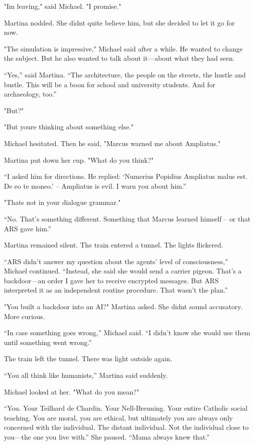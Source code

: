 \documentclass[
]{article}
\begin{document}
"I\textquotesingle m leaving," said Michael. "I promise."

Martina nodded. She didn\textquotesingle t quite believe him, but she decided to let it go for now.

"The simulation is impressive," Michael said after a while. He wanted to change the subject. But he also wanted to talk about it---about what they had seen.

``Yes,'' said Martina. ``The architecture, the people on the streets, the hustle and bustle. This will be a boon for school and university students. And for archaeology, too.''

"But?"

"But you\textquotesingle re thinking about something else."

Michael hesitated. Then he said, "Marcus warned me about Ampliatus."

Martina put down her cup. "What do you think?"

``I asked him for directions. He replied: `Numerius Popidius Ampliatus malus est. De eo te moneo.' -- Ampliatus is evil. I warn you about him.''

"That\textquotesingle s not in your dialogue grammar."

``No. That's something different. Something that Marcus learned himself -- or that ARS gave him.''

Martina remained silent. The train entered a tunnel. The lights flickered.

``ARS didn't answer my question about the agents' level of consciousness,'' Michael continued. ``Instead, she said she would send a carrier pigeon. That's a backdoor---an order I gave her to receive encrypted messages. But ARS interpreted it as an independent routine procedure. That wasn't the plan.''

"You built a backdoor into an AI?" Martina asked. She didn\textquotesingle t sound accusatory. More curious.

``In case something goes wrong,'' Michael said. ``I didn't know she would use them until something went wrong.''

The train left the tunnel. There was light outside again.

``You all think like humanists,'' Martina said suddenly.

Michael looked at her. "What do you mean?"

``You. Your Teilhard de Chardin. Your Nell-Breuning. Your entire Catholic social teaching. You are moral, you are ethical, but ultimately you are always only concerned with the individual. The distant individual. Not the individual close to you---the one you live with.'' She paused. ``Mama always knew that.''
\end{document}
